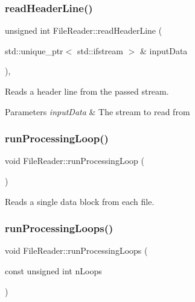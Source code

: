 \subsubsection{\texorpdfstring{read\+Header\+Line()}{readHeaderLine()}}
{\footnotesize\ttfamily unsigned int File\+Reader\+::read\+Header\+Line (\begin{DoxyParamCaption}\item[{std\+::unique\+\_\+ptr$<$ std\+::ifstream $>$ \&}]{input\+Data }\end{DoxyParamCaption})\hspace{0.3cm}{\ttfamily [inline]}, {\ttfamily [private]}}



Reads a header line from the passed stream. 


\begin{DoxyParams}{Parameters}
{\em input\+Data} & The stream to read from \\
\hline
\end{DoxyParams}
\mbox{\label{class_file_reader_a98606ec7d315f1ed6f90c531df0d09f9}} 
\subsubsection{\texorpdfstring{run\+Processing\+Loop()}{runProcessingLoop()}}
{\footnotesize\ttfamily void File\+Reader\+::run\+Processing\+Loop (\begin{DoxyParamCaption}{ }\end{DoxyParamCaption})\hspace{0.3cm}{\ttfamily [private]}}



Reads a single data block from each file. 

\mbox{\label{class_file_reader_a478ed77f1b8f76e15cb2faa8964a26e6}} 
\subsubsection{\texorpdfstring{run\+Processing\+Loops()}{runProcessingLoops()}}
{\footnotesize\ttfamily void File\+Reader\+::run\+Processing\+Loops (\begin{DoxyParamCaption}\item[{const unsigned int}]{n\+Loops }\end{DoxyParamCaption})}



